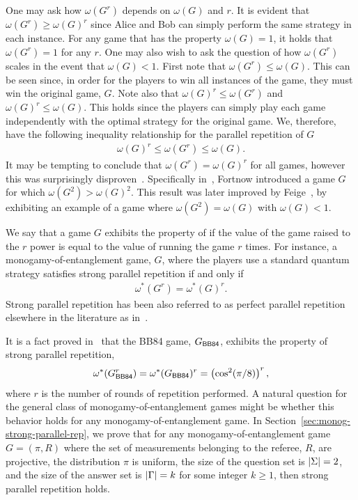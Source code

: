 One may ask how $\omega(G^r)$ depends on $\omega(G)$ and $r$. It is evident that $\omega(G^r) \geq \omega(G)^r$ since Alice and Bob can simply perform the same strategy in each instance. For any game that has the property $\omega(G) = 1$, it holds that $\omega(G^r) = 1$ for any $r$. One may also wish to ask the question of how $\omega(G^r)$ scales in the event that $\omega(G) < 1$. First note that $\omega(G^r) \leq \omega(G)$. This can be seen since, in order for the players to win all instances of the game, they must win the original game, $G$. Note also that $\omega(G)^r \leq \omega(G^r)$ and $\omega(G)^r \leq \omega(G)$. This holds since the players can simply play each game independently with the optimal strategy for the original game. We, therefore, have the following inequality relationship for the parallel repetition of $G$\
\begin{align}
	\omega(G)^r \leq \omega(G^r) \leq \omega(G). 
\end{align} 
It may be tempting to conclude that $\omega(G^r) = \omega(G)^r$ for all games, however this was surprisingly disproven~\cite{Fortnow1990, Feige1991, Verbitsky1996, Feige2002}. Specifically in~\cite{Fortnow1990}, Fortnow introduced a game $G$ for which $\omega(G^2) > \omega(G)^2$. This result was later improved by Feige~\cite{Feige1991}, by exhibiting an example of a game where $\omega(G^2) = \omega(G)$ with $\omega(G) < 1$.  

We say that a game $G$ exhibits the property of  if the value of the game raised to the $r$ power is equal to the value of running the game $r$ times. For instance, a monogamy-of-entanglement game, $G$, where the players use a standard quantum strategy satisfies strong parallel repetition if and only if
\begin{align}
	\omega^*(G^r) = \omega^*(G)^r. 
\end{align}
Strong parallel repetition has been also referred to as perfect parallel repetition elsewhere in the literature as in~\cite{Cleve2008}. 

It is a fact proved in~\cite{Tomamichel2013} that the BB84 game, $G_{\BB84}$, exhibits the property of strong parallel repetition,
\begin{align}
	\omega^*(G_{\BB84}^r) = \omega^*(G_{\BB84})^r = \left( \cos^2(\pi/8) \right)^r,
\end{align}
where $r$ is the number of rounds of repetition performed. A natural question for the general class of monogamy-of-entanglement games might be whether this behavior holds for any monogamy-of-entanglement game. In Section~\ref{sec:monog-strong-parallel-rep}, we prove that for any monogamy-of-entanglement game $G = (\pi,R)$ where the set of measurements belonging to the referee, $R$, are projective, the distribution $\pi$ is uniform, the size of the question set is $\left\lvert \Sigma \right\rvert = 2$, and the size of the answer set is $\left\lvert \Gamma \right\rvert = k$ for some integer $k \geq 1$, then strong parallel repetition holds. 

